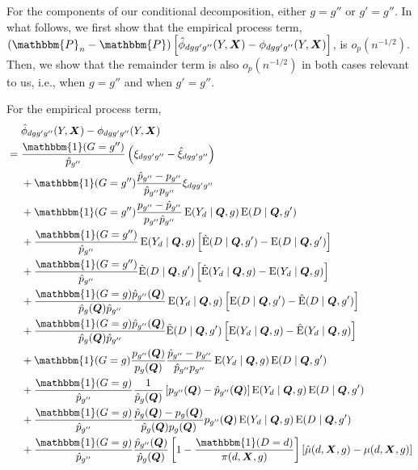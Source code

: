 \documentclass[12pt,a4paper]{article}
\newcommand{\E}{\operatorname{E}}
\def\X{{\boldsymbol X}}
\def\Q{{\boldsymbol Q}}
\def\one{\mathbbm{1}}
\def\P{\mathbbm{P}}
\begin{document}
For the components of our conditional decomposition, either $g=g''$ or $g'=g''$. In what follows, we first show that the empirical process term, $(\P_n-\P) \left[ \hat{\phi}_{dgg'g''}(Y,\X)- \phi_{dgg'g''}(Y,\X) \right]$, is $o_p(n^{-1/2})$. Then, we show that the remainder term is also $o_p(n^{-1/2})$ in both cases relevant to us, i.e., when $g=g''$ and when $g'=g''$.

For the empirical process term, 
\begin{align*}
    &\phantom{{}={}} \hat{\phi}_{dgg'g''}(Y,\X)-\phi_{dgg'g''}(Y,\X) \\
    &= \frac{\one(G=g'')}{\hat{p}_{g''}}\left(\xi_{dgg'g''}-\hat{\xi}_{dgg'g''}\right) \\
    &\phantom{{}={}} + \one(G=g'')\frac{\hat{p}_{g''}-p_{g''}}{\hat{p}_{g''}p_{g''}} \xi_{dgg'g''} \\
    &\phantom{{}={}} + \one(G=g'')\frac{p_{g''}-\hat{p}_{g''}}{p_{g''}\hat{p}_{g''}}\E(Y_d \mid \Q,g)\E(D \mid \Q,g') \\
    &\phantom{{}={}} + \frac{\one(G=g'')}{\hat{p}_{g''}} \E(Y_d \mid \Q,g)\left[ \hat{\E}(D \mid \Q,g')-\E(D \mid \Q,g')\right] \\
    &\phantom{{}={}} + \frac{\one(G=g'')}{\hat{p}_{g''}} \hat{\E}(D \mid \Q,g')\left[\hat{\E}(Y_d \mid \Q,g)-\E(Y_d \mid \Q,g) \right] \\
    &\phantom{{}={}} + \frac{\one(G=g) \hat{p}_{g''}(\Q)}{\hat{p}_{g}(\Q) \hat{p}_{g''}} \E(Y_d \mid \Q,g) \left[ \E(D \mid \Q,g')-\hat{\E}(D \mid \Q,g') \right] \\
    &\phantom{{}={}} + \frac{\one(G=g) \hat{p}_{g''}(\Q)}{\hat{p}_{g}(\Q) \hat{p}_{g''}} \hat{\E}(D \mid \Q,g')\left[\E(Y_d \mid \Q,g)-\hat{\E}(Y_d \mid \Q,g) \right] \\
    &\phantom{{}={}} + \one(G=g)\frac{p_{g''}(\Q)}{p_g(\Q)}\frac{\hat{p}_{g''}-p_{g''}}{\hat{p}_{g''}p_{g''}} \E(Y_d \mid \Q,g)\E(D \mid \Q,g') \\
    &\phantom{{}={}} + \frac{\one(G=g)}{\hat{p}_{g''}}\frac{1}{\hat{p}_g(\Q)}\left[p_{g''}(\Q)-\hat{p}_{g''}(\Q) \right] \E(Y_d \mid \Q,g)\E(D \mid \Q,g') \\
    &\phantom{{}={}} + \frac{\one(G=g)}{\hat{p}_{g''}} \frac{\hat{p}_g(\Q)-p_g(\Q)}{\hat{p}_g(\Q)p_g(\Q)} p_{g''}(\Q)\E(Y_d \mid \Q,g)\E(D \mid \Q,g') \\
    &\phantom{{}={}} + \frac{\one(G=g)}{\hat{p}_{g''}}\frac{\hat{p}_{g''}(\Q)}{\hat{p}_{g}(\Q)} \left[ 1-\frac{\one(D=d)}{\pi(d,\X,g)} \right] \left[\hat{\mu}(d,\X,g)-\mu(d,\X,g)\right] \\

\end{align*}
\end{document}
